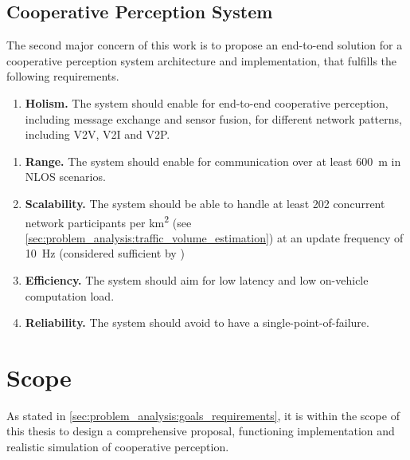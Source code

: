 \subsection{Cooperative Perception System}
\label{subsec:problem_analysis:cooperative_perception_system}

The second major concern of this work is to propose an end-to-end solution for a cooperative perception system architecture and implementation, that fulfills the following requirements. 

\begin{enumerate}[F-C1:\ \ ]
	\item \textbf{Holism.} The system should enable for end-to-end cooperative perception, including message exchange and sensor fusion, for different network patterns, including V2V, V2I and V2P.
	\end{enumerate}
\begin{enumerate}[NF-C1:]
	\item \textbf{Range.} The system should enable for communication over at least \SI{600}{\meter} in NLOS scenarios.
	\item \textbf{Scalability.} The system should be able to handle at least 202 concurrent network participants per \si{\square\kilo\meter} (see \cref{sec:problem_analysis:traffic_volume_estimation}) at an update frequency of \SI{10}{\hertz} (considered sufficient by \cite{Rauch2011, Thandavarayan2019})
	\item \textbf{Efficiency.} The system should aim for low latency and low on-vehicle computation load.
	\item \textbf{Reliability.} The system should avoid to have a single-point-of-failure. 
\end{enumerate}

\section{Scope}
\label{sec:problem_analysis:scope}
As stated in \cref{sec:problem_analysis:goals_requirements}, it is within the scope of this thesis to design a comprehensive proposal, functioning implementation and realistic simulation of cooperative perception.

